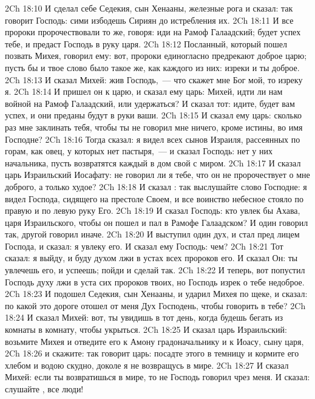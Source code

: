 \vs 2Ch 18:10 И сделал себе Седекия, сын Хенааны, железные рога и сказал: так говорит Господь: сими избодешь Сириян до истребления их.
\vs 2Ch 18:11 И все пророки пророчествовали то же, говоря: иди на Рамоф Галаадский; будет успех тебе, и предаст  Господь в руку царя.
\rsbpar\vs 2Ch 18:12 Посланный, который пошел позвать Михея, говорил ему: вот, пророки единогласно предрекают доброе царю; пусть бы и твое слово было такое же, как каждого из них: изреки и ты доброе.
\vs 2Ch 18:13 И сказал Михей: жив Господь,~--- что скажет мне Бог мой, то изреку я.
\vs 2Ch 18:14 И пришел он к царю, и сказал ему царь: Михей, идти ли нам войной на Рамоф Галаадский, или удержаться? И сказал тот: идите, будет вам успех, и они преданы будут в руки ваши.
\vs 2Ch 18:15 И сказал ему царь: сколько раз мне заклинать тебя, чтобы ты не говорил мне ничего, кроме истины, во имя Господне?
\vs 2Ch 18:16 Тогда  сказал: я видел всех сынов Израиля, рассеянных по горам, как овец, у которых нет пастыря,~--- и сказал Господь: нет у них начальника, пусть возвратятся каждый в дом свой с миром.
\vs 2Ch 18:17 И сказал царь Израильский Иосафату: не говорил ли я тебе, что он не пророчествует о мне доброго, а только худое?
\vs 2Ch 18:18 И сказал : так выслушайте слово Господне: я видел Господа, сидящего на престоле Своем, и все воинство небесное стояло по правую и по левую руку Его.
\vs 2Ch 18:19 И сказал Господь: кто увлек бы Ахава, царя Израильского, чтобы он пошел и пал в Рамофе Галаадском? И один говорил так, другой говорил иначе.
\vs 2Ch 18:20 И выступил один дух, и стал пред лицем Господа, и сказал: я увлеку его. И сказал ему Господь: чем?
\vs 2Ch 18:21 Тот сказал: я выйду, и буду духом лжи в устах всех пророков его. И сказал Он: ты увлечешь его, и успеешь; пойди и сделай так.
\vs 2Ch 18:22 И теперь, вот попустил Господь духу лжи  в уста сих пророков твоих, но Господь изрек о тебе недоброе.
\vs 2Ch 18:23 И подошел Седекия, сын Хенааны, и ударил Михея по щеке, и сказал: по какой это дороге отошел от меня Дух Господень, чтобы говорить в тебе?
\vs 2Ch 18:24 И сказал Михей: вот, ты увидишь  в тот день, когда будешь бегать из комнаты в комнату, чтобы укрыться.
\vs 2Ch 18:25 И сказал царь Израильский: возьмите Михея и отведите его к Амону градоначальнику и к Иоасу, сыну царя,
\vs 2Ch 18:26 и скажите: так говорит царь: посадте этого в темницу и кормите его хлебом и водою скудно, доколе я не возвращусь в мире.
\vs 2Ch 18:27 И сказал Михей: если ты возвратишься в мире, то не Господь говорил чрез меня. И сказал: слушайте , все люди!
